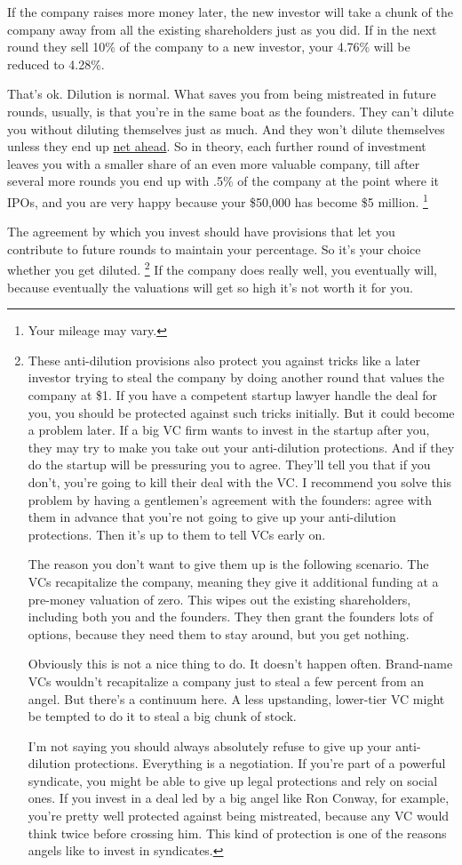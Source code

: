 \documentclass[12pt]{book}
\begin{document}
If the company raises more money later, the new investor will take a
chunk of the company away from all the existing shareholders just as you
did. If in the next round they sell 10\% of the company to a new
investor, your 4.76\% will be reduced to 4.28\%.

That's ok. Dilution is normal. What saves you from being mistreated in
future rounds, usually, is that you're in the same boat as the founders.
They can't dilute you without diluting themselves just as much. And they
won't dilute themselves unless they end up \href{equity.html}{net
ahead}. So in theory, each further round of investment leaves you with a
smaller share of an even more valuable company, till after several more
rounds you end up with .5\% of the company at the point where it IPOs,
and you are very happy because your \$50,000 has become \$5 million.
\footnote{Your mileage may vary.}

The agreement by which you invest should have provisions that let you
contribute to future rounds to maintain your percentage. So it's your
choice whether you get diluted. \footnote{These anti-dilution provisions also protect you against tricks
like a later investor trying to steal the company by doing another round
that values the company at \$1. If you have a competent startup lawyer
handle the deal for you, you should be protected against such tricks
initially. But it could become a problem later. If a big VC firm wants
to invest in the startup after you, they may try to make you take out
your anti-dilution protections. And if they do the startup will be
pressuring you to agree. They'll tell you that if you don't, you're
going to kill their deal with the VC. I recommend you solve this problem
by having a gentlemen's agreement with the founders: agree with them in
advance that you're not going to give up your anti-dilution protections.
Then it's up to them to tell VCs early on.

The reason you don't want to give them up is the following scenario. The
VCs recapitalize the company, meaning they give it additional funding at
a pre-money valuation of zero. This wipes out the existing shareholders,
including both you and the founders. They then grant the founders lots
of options, because they need them to stay around, but you get nothing.

Obviously this is not a nice thing to do. It doesn't happen often.
Brand-name VCs wouldn't recapitalize a company just to steal a few
percent from an angel. But there's a continuum here. A less upstanding,
lower-tier VC might be tempted to do it to steal a big chunk of stock.

I'm not saying you should always absolutely refuse to give up your
anti-dilution protections. Everything is a negotiation. If you're part
of a powerful syndicate, you might be able to give up legal protections
and rely on social ones. If you invest in a deal led by a big angel like
Ron Conway, for example, you're pretty well protected against being
mistreated, because any VC would think twice before crossing him. This
kind of protection is one of the reasons angels like to invest in
syndicates.} If the company
does really well, you eventually will, because eventually the valuations
will get so high it's not worth it for you.
\end{document}
